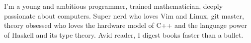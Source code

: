 

\begin{cvparagraph}
    
    I'm a young and ambitious programmer, trained mathematician, deeply
    passionate about computers. Super nerd who loves Vim and Linux, git master,
    theory obsessed who loves the hardware model of C++ and the language power
    of Haskell and its type theory. Avid reader, I digest books faster than a
    bullet.
\end{cvparagraph}
